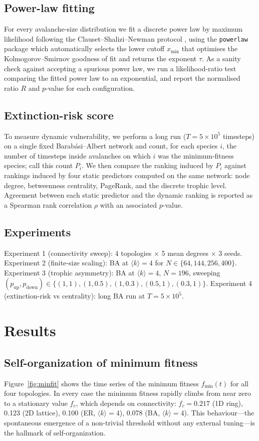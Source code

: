 \documentclass[10pt,a4paper,twocolumn]{article}
\begin{document}
\subsection{Power-law fitting}
For every avalanche-size distribution we fit a discrete power law by maximum likelihood following the Clauset--Shalizi--Newman protocol \citep{clauset2009power}, using the \texttt{powerlaw} package \citep{alstott2014powerlaw} which automatically selects the lower cutoff $x_{\min}$ that optimises the Kolmogorov--Smirnov goodness of fit and returns the exponent $\tau$. As a sanity check against accepting a spurious power law, we run a likelihood-ratio test comparing the fitted power law to an exponential, and report the normalised ratio $R$ and $p$-value for each configuration.

\subsection{Extinction-risk score}
To measure dynamic vulnerability, we perform a long run ($T = 5 \times 10^5$ timesteps) on a single fixed Barab\'asi--Albert network and count, for each species $i$, the number of timesteps inside avalanches on which $i$ was the minimum-fitness species; call this count $P_i$. We then compare the ranking induced by $P_i$ against rankings induced by four static predictors computed on the same network: node degree, betweenness centrality, PageRank, and the discrete trophic level. Agreement between each static predictor and the dynamic ranking is reported as a Spearman rank correlation $\rho$ with an associated $p$-value.

\subsection{Experiments}
Experiment 1 (connectivity sweep): 4 topologies $\times$ 5 mean degrees $\times$ 3 seeds. Experiment 2 (finite-size scaling): BA at $\langle k \rangle = 4$ for $N \in \{64, 144, 256, 400\}$. Experiment 3 (trophic asymmetry): BA at $\langle k \rangle = 4$, $N=196$, sweeping $(p_{\text{up}}, p_{\text{down}}) \in \{(1,1),(1,0.5),(1,0.3),(0.5,1),(0.3,1)\}$. Experiment 4 (extinction-risk vs centrality): long BA run at $T = 5 \times 10^5$.

\section{Results}\label{sec:results}

\subsection{Self-organization of minimum fitness}
Figure~\ref{fig:minfit} shows the time series of the minimum fitness $f_{\min}(t)$ for all four topologies. In every case the minimum fitness rapidly climbs from near zero to a stationary value $f_c$, which depends on connectivity: $f_c = 0.217$ (1D ring), 0.123 (2D lattice), 0.100 (ER, $\langle k \rangle = 4$), 0.078 (BA, $\langle k \rangle = 4$). This behaviour---the spontaneous emergence of a non-trivial threshold without any external tuning---is the hallmark of self-organization.
\end{document}
